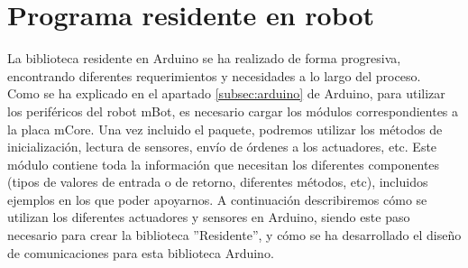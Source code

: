 \section{Programa residente en robot}\label{sec:residente}
La biblioteca residente en Arduino se ha realizado de forma progresiva, encontrando diferentes requerimientos y necesidades a lo largo del proceso. \\

Como se ha explicado en el apartado \ref{subsec:arduino} de Arduino, para utilizar los periféricos del robot mBot, es necesario cargar los módulos correspondientes a la placa mCore. Una vez incluido el paquete, podremos utilizar los métodos de inicialización, lectura de sensores, envío de órdenes a los actuadores, etc. Este módulo contiene toda la información que necesitan los diferentes componentes (tipos de valores de entrada o de retorno, diferentes métodos, etc), incluidos ejemplos en los que poder apoyarnos. A continuación describiremos cómo se utilizan los diferentes actuadores y sensores en Arduino, siendo este paso necesario para crear la biblioteca ''Residente'', y cómo se ha desarrollado el diseño de comunicaciones para esta biblioteca Arduino.

